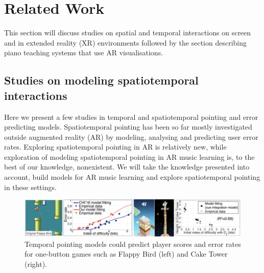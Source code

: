 \documentclass[manuscript,screen]{acmart}
\begin{document}
\section{Related Work}
This section will discuss studies on spatial and temporal interactions on screen and in extended reality (XR) environments followed by the section describing piano teaching systems that use AR visualisations. 

\subsection{Studies on modeling spatiotemporal interactions}
Here we present a few studies in temporal and spatiotemporal pointing and error predicting models. Spatiotemporal pointing has been so far mostly investigated outside augmented reality (AR) by modeling, analysing and predicting user error rates. Exploring spatiotemporal pointing in AR is relatively new, while exploration of modeling spatiotemporal pointing in AR music learning is, to the best of our knowledge, nonexistent. We will take the knowledge presented into account, build models for AR music learning and explore spatiotemporal pointing in these settings.

\begin{figure}[t]
\centering
 \includegraphics[width=12cm]{figures/flappybird.png}
    \caption{Temporal pointing models could predict player scores and error rates for one-button games such as Flappy Bird (left) and Cake Tower (right).
    }\label{fig:flappybird}
\end{figure}
\end{document}
